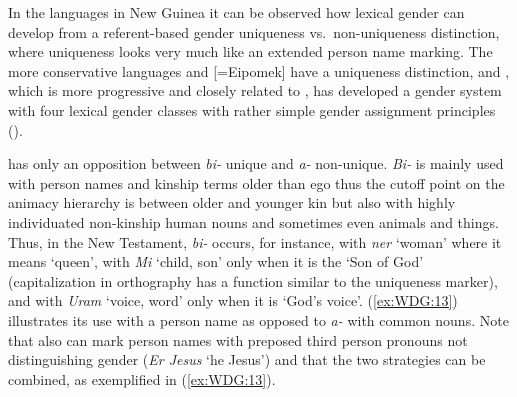 \documentclass[output=collectionpaper]{langsci/langscibook}
\begin{document}
In the  languages in New Guinea it can be observed how lexical gender can develop from a referent-based gender uniqueness vs.\ non-uniqueness distinction, where uniqueness looks very much like an extended person name marking. The more conservative  languages  and  [=Eipomek] have a uniqueness distinction, and , which is more progressive and closely related to , has developed a gender system with four lexical gender classes with rather simple gender assignment principles (\citealt{Waelchli2018}).

 has only an opposition between \textit{bi-} unique and \textit{a-} non-unique. \textit{Bi-} is mainly used with person names and kinship terms older than ego \textendash{} thus the cutoff point on the animacy hierarchy is between older and younger kin \textendash{} but also with highly individuated non-kinship human nouns and sometimes even animals and things. Thus, in the  New Testament, \textit{bi-} occurs, for instance, with \textit{ner} `woman' where it means `queen', with \textit{Mi} `child, son' only when it is the `Son of God' (capitalization in orthography has a function similar to the uniqueness marker), and with \textit{Uram} `voice, word' only when it is `God's voice'. (\ref{ex:WDG:13}) illustrates its use with a person name as opposed to \textit{a-} with common nouns. Note that  also can mark person names with preposed third person pronouns not distinguishing gender (\textit{Er Jesus} `he Jesus') and that the two strategies can be combined, as exemplified in (\ref{ex:WDG:13}).

%
\end{document}
